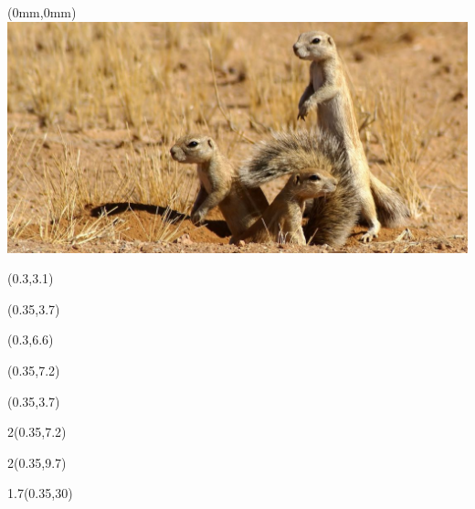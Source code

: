 \begin{textblock*}{\paperwidth}(0mm,0mm)
  \includegraphics[height=\imageheight,%
                   width=\paperwidth,%
                   trim=555 185 251 0,clip]{Xerus_inauris_1}
\end{textblock*}

\begin{textblock*}{\paperwidth}(0.3\TPHorizModule,3.1\TPVertModule)
  \fbox{\textcolor{white}{\rule{2.27\TPHorizModule}{2.9\TPVertModule}}}
\end{textblock*}
\begin{textblock*}{\paperwidth}(0.35\TPHorizModule,3.7\TPVertModule)
  \titlefmt
\end{textblock*}

\begin{textblock*}{\paperwidth}(0.3\TPHorizModule,6.6\TPVertModule)
  \fbox{\textcolor{white}{\rule{0.97\TPHorizModule}{2.0\TPVertModule}}}
\end{textblock*}
\begin{textblock*}{\paperwidth}(0.35\TPHorizModule,7.2\TPVertModule)
  \authorfmt
\end{textblock*}

\null\cleardoublepage


\begin{textblock*}{\paperwidth}(0.35\TPHorizModule,3.7\TPVertModule)
  \titlefmt
\end{textblock*}

\begin{textblock*}{2\TPHorizModule}(0.35\TPHorizModule,7.2\TPVertModule)
  \authorfmt
\end{textblock*}

\begin{textblock*}{2\TPHorizModule}(0.35\TPHorizModule,9.7\TPVertModule)
  \affiliation
\end{textblock*}

\begin{textblock*}{1.7\TPHorizModule}(0.35\TPHorizModule,30\TPVertModule)
  \edition
\end{textblock*}
\endgroup


